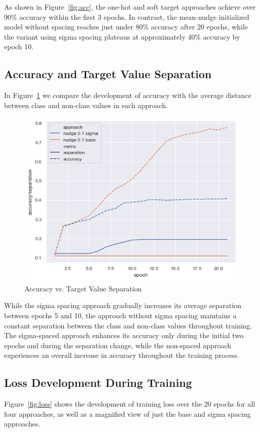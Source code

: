 \documentclass[12pt,fleqn,a4paper]{article}
\begin{document}
As shown in Figure~\ref{fig:acc}, the one-hot and soft target approaches achieve over 90\% accuracy within the first 3 epochs. In contrast, the mean-nudge initialized model without spacing reaches just under 80\% accuracy after 20 epochs, while the variant using sigma spacing plateaus at approximately 40\% accuracy by epoch 10.
\subsection{Accuracy and Target Value Separation}
In Figure~\ref{fig:accvsep} we compare the development of accuracy with the average distance between class and non-class values in each approach.

\begin{figure}[H]
    \centering
    \includegraphics[width=0.6\linewidth]{graphs/accvsep.png}
    \caption{Accuracy vs. Target Value Separation}
    \label{fig:accvsep}
\end{figure}

While the sigma spacing approach gradually increases its average separation between epochs 5 and 10, the approach without sigma spacing maintains a constant separation between the class and non-class values throughout training. The sigma-spaced approach enhances its accuracy only during the initial two epochs and during the separation change, while the non-spaced approach experiences an overall increase in accuracy throughout the training process.
\subsection{Loss Development During Training}
Figure~\ref{fig:loss} shows the development of training loss over the 20 epochs for all four approaches, as well as a magnified view of just the base and sigma spacing approaches.
\end{document}
